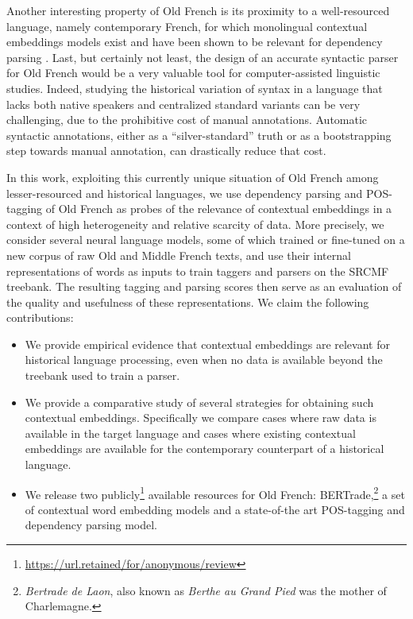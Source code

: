 Another interesting property of Old French is its proximity to a well-resourced language, namely contemporary French, for which monolingual contextual embeddings models exist and have been shown to be relevant for dependency parsing  \citep{le-etal-2020-flaubert,martin-etal-2020-camembert}.
Last, but certainly not least, the design of an accurate syntactic parser for Old French would be a very valuable tool for computer-assisted linguistic studies.
Indeed, studying the historical variation of syntax in a language that lacks both native speakers and centralized standard variants can be very challenging, due to the prohibitive cost of manual annotations. Automatic syntactic annotations, either as a \enquote{silver-standard} truth or as a bootstrapping step towards manual annotation, can drastically reduce that cost.

In this work, exploiting this currently unique situation of Old French among lesser-resourced and historical languages, we use dependency parsing and POS-tagging of Old French as probes of the relevance of contextual embeddings in a context of high heterogeneity and relative scarcity of data. 
More precisely, we consider several neural language models, some of which trained or fine-tuned on a new corpus of raw Old and Middle French texts, and use their internal representations of words as inputs to train taggers and parsers on the SRCMF treebank. The resulting tagging and parsing scores then serve as an evaluation of the quality and usefulness of these representations.
We claim the following contributions:
%
\begin{itemize}
    \item We provide empirical evidence that contextual embeddings are relevant for historical language processing, even when no data is available beyond the treebank used to train a parser.
    \item We provide a comparative study of several strategies for obtaining such contextual embeddings. Specifically we compare cases where raw data is available in the target language and cases where existing contextual embeddings are available for the contemporary counterpart of a historical language.
    \item We release two publicly\footnote{\url{https://url.retained/for/anonymous/review}} available resources for Old French: BERTrade,\footnote{\emph{Bertrade de Laon}, also known as \emph{Berthe au Grand Pied} was the mother of Charlemagne.} a set of contextual word embedding models and a state-of-the art POS-tagging and dependency parsing model.
\end{itemize}

